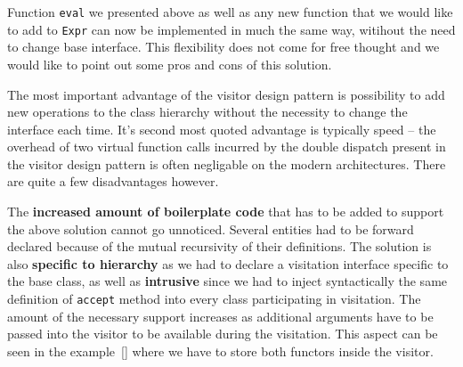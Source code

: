 \documentclass[preprint]{sigplanconf}
\DeclareRobustCommand{\code}[1]{{\lstinline[breaklines=false]{#1}}}
\begin{document}
Function \code{eval} we presented above as well as any new function that we 
would like to add to \code{Expr} can now be implemented in much the same way, 
witihout the need to change base interface. This flexibility does not come for 
free thought and we would like to point out some pros and cons of this solution.

The most important advantage of the visitor design pattern is possibility to add 
new operations to the class hierarchy without the necessity to change the 
interface each time. It's second most quoted advantage is typically speed -- the 
overhead of two virtual function calls incurred by the double dispatch present 
in the visitor design pattern is often negligable on the modern architectures. 
There are quite a few disadvantages however.

The {\bf increased amount of boilerplate code} that has to be added to support 
the above solution cannot go unnoticed. Several entities had to be forward 
declared because of the mutual recursivity of their definitions. The solution is 
also {\bf specific to hierarchy} as we had to declare a visitation interface 
specific to the base class, as well as {\bf intrusive} since we had to inject 
syntactically the same definition of \code{accept} method into every class 
participating in visitation. The amount of the necessary support increases as 
additional arguments have to be passed into the visitor to be available during 
the visitation. This aspect can be seen in the example~\ref{} where we have to 
store both functors inside the visitor.
\end{document}
